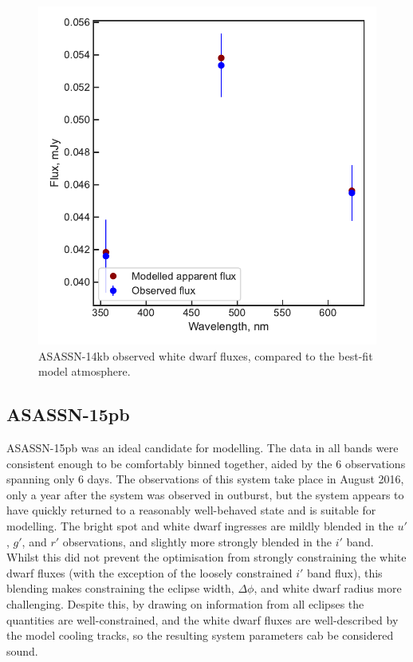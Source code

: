 \begin{figure}
    \centering
    \includegraphics[width=\textwidth]{figures/results/ASASSN-14kb/fluxplot.pdf}
    \caption{ASASSN-14kb observed white dwarf fluxes, compared to the best-fit model atmosphere.}
    \label{fig:ASASSN-14kb flux plot}
\end{figure}
\clearpage



\newpage
\subsection{ASASSN-15pb}

ASASSN-15pb was an ideal candidate for modelling. The data in all bands were consistent enough to be comfortably binned together, aided by the 6 observations spanning only 6 days.
The observations of this system take place in August 2016, only a year after the system was observed in outburst, but the system appears to have quickly returned to a reasonably well-behaved state and is suitable for modelling.
The bright spot and white dwarf ingresses are mildly blended in the $u'$, $g'$, and $r'$ observations, and slightly more strongly blended in the $i'$ band. Whilst this did not prevent the optimisation from strongly constraining the white dwarf fluxes (with the exception of the loosely constrained $i'$ band flux), this blending makes constraining the eclipse width, $\Delta\phi$, and white dwarf radius more challenging. Despite this, by drawing on information from all eclipses the quantities are well-constrained, and the white dwarf fluxes are well-described by the model cooling tracks, so the resulting system parameters cab be considered sound.

